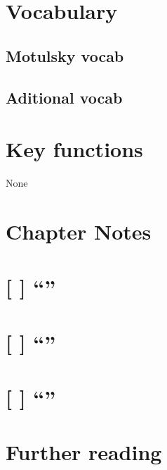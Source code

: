 \documentclass[]{book}
\theoremstyle{definition}
\theoremstyle{definition}
\theoremstyle{definition}
\theoremstyle{remark}
\begin{document}
\section*{Vocabulary}\label{vocabulary-10}

\subsection*{Motulsky vocab}\label{motulsky-vocab-10}

\subsection*{Aditional vocab}\label{aditional-vocab-7}

\section*{Key functions}\label{key-functions-9}

None

\section*{Chapter Notes}\label{chapter-notes-10}

\section{\texorpdfstring{{[} {]} ``''}{{[} {]} }}\label{section-12}

\section{\texorpdfstring{{[} {]} ``''}{{[} {]} }}\label{section-13}

\section{\texorpdfstring{{[} {]} ``''}{{[} {]} }}\label{section-14}

\section*{Further reading}\label{further-reading-9}
\end{document}
